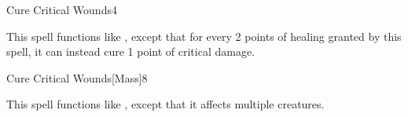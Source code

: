 \begin{spellsection}{Cure Critical Wounds}{4}
    \begin{spellheader}
    \end{spellheader}
    \begin{spellcontent}
        \begin{spelltargetinginfo}
        \end{spelltargetinginfo}
        \begin{spelleffects}
            \spellspecial This spell functions like , except that for every 2 points of healing granted by this spell, it can instead cure 1 point of critical damage.
        \end{spelleffects}
    \end{spellcontent}
    \begin{spellfooter}
        \miscastrandom
    \end{spellfooter}
\end{spellsection}

\begin{spellsection}{Cure Critical Wounds}[Mass]{8}
    \begin{spellheader}
    \end{spellheader}
    \begin{spellcontent}
        \begin{spelltargetinginfo}
        \end{spelltargetinginfo}
        \begin{spelleffects}
            \spellspecial This spell functions like , except that it affects multiple creatures.
        \end{spelleffects}
    \end{spellcontent}
    \begin{spellfooter}
        \miscastexplode
    \end{spellfooter}
\end{spellsection}

